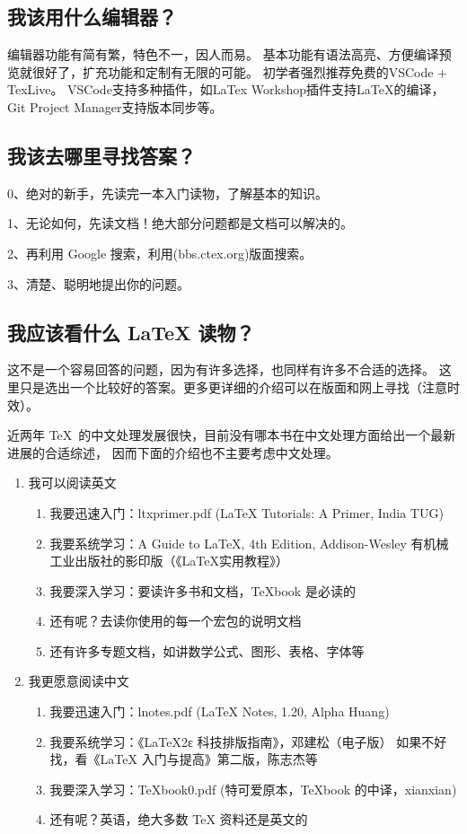 \subsection{我该用什么编辑器？}

编辑器功能有简有繁，特色不一，因人而易。
基本功能有语法高亮、方便编译预览就很好了，扩充功能和定制有无限的可能。
初学者强烈推荐免费的VSCode + TexLive。
VSCode支持多种插件，如LaTex Workshop插件支持LaTeX的编译，
Git Project Manager支持版本同步等。


\subsection{我该去哪里寻找答案？}

0、绝对的新手，先读完一本入门读物，了解基本的知识。

1、无论如何，先读文档！绝大部分问题都是文档可以解决的。

2、再利用 Google 搜索，利用(bbs.ctex.org)版面搜索。

3、清楚、聪明地提出你的问题。


\subsection{我应该看什么 LaTeX 读物？}

这不是一个容易回答的问题，因为有许多选择，也同样有许多不合适的选择。
这里只是选出一个比较好的答案。更多更详细的介绍可以在版面和网上寻找（注意时效）。

近两年 \TeX\ 的中文处理发展很快，目前没有哪本书在中文处理方面给出一个最新进展的合适综述，
因而下面的介绍也不主要考虑中文处理。

\begin{enumerate}
\item 我可以阅读英文

\begin{enumerate}
\item 我要迅速入门：ltxprimer.pdf (LaTeX Tutorials: A Primer, India TUG)
\item 我要系统学习：A Guide to LaTeX, 4th Edition, Addison-Wesley
      有机械工业出版社的影印版（《LaTeX实用教程》）
\item 我要深入学习：要读许多书和文档，TeXbook 是必读的
\item 还有呢？去读你使用的每一个宏包的说明文档
\item 还有许多专题文档，如讲数学公式、图形、表格、字体等
\end{enumerate}

\item 我更愿意阅读中文
\begin{enumerate}
\item 我要迅速入门：lnotes.pdf (LaTeX Notes, 1.20, Alpha Huang)
\item 我要系统学习：《LaTeX2ε 科技排版指南》，邓建松（电子版）
 如果不好找，看《LaTeX 入门与提高》第二版，陈志杰等
\item 我要深入学习：TeXbook0.pdf (特可爱原本，TeXbook 的中译，xianxian)
\item 还有呢？英语，绝大多数 TeX 资料还是英文的
\end{enumerate}
\end{enumerate}


